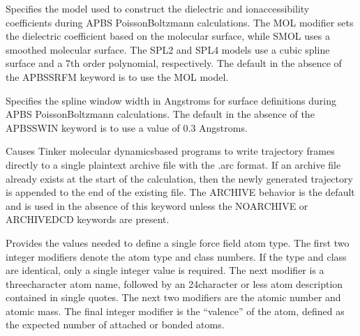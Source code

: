 \documentclass[letterpaper,11pt,english]{sphinxmanual}
\begin{document}
\ignorespaces {}\label{\detokenize{text/keywords:key-apbs-srfm}}\begin{description}
\sphinxAtStartPar
Specifies the model used to construct the dielectric and ion\sphinxhyphen{}accessibility coefficients during APBS Poisson\sphinxhyphen{}Boltzmann calculations. The MOL modifier sets the dielectric coefficient based on the molecular surface, while SMOL uses a smoothed molecular surface. The SPL2 and SPL4 models use a cubic spline surface and a 7th order polynomial, respectively. The default in the absence of the APBS\sphinxhyphen{}SRFM keyword is to use the MOL model.

\end{description}

\ignorespaces {}\label{\detokenize{text/keywords:key-apbs-swin}}\begin{description}
\sphinxAtStartPar
Specifies the spline window width in Angstroms for surface definitions during APBS Poisson\sphinxhyphen{}Boltzmann calculations. The default in the absence of the APBS\sphinxhyphen{}SWIN keyword is to use a value of 0.3 Angstroms.

\end{description}

\ignorespaces {}\label{\detokenize{text/keywords:key-archive}}\begin{description}
\sphinxAtStartPar
Causes Tinker molecular dynamics\sphinxhyphen{}based programs to write trajectory frames directly to a single plain\sphinxhyphen{}text archive file with the .arc format. If an archive file already exists at the start of the calculation, then the newly generated trajectory is appended to the end of the existing file. The ARCHIVE behavior is the default and is used in the absence of this keyword unless the NO\sphinxhyphen{}ARCHIVE or ARCHIVE\sphinxhyphen{}DCD keywords are present.

\end{description}

\ignorespaces {}\label{\detokenize{text/keywords:key-atom}}\begin{description}
\sphinxAtStartPar
Provides the values needed to define a single force field atom type. The first two integer modifiers denote the atom type and class numbers. If the type and class are identical, only a single integer value is required. The next modifier is a three\sphinxhyphen{}character atom name, followed by an 24\sphinxhyphen{}character or less atom description contained in single quotes. The next two modifiers are the atomic number and atomic mass. The final integer modifier is the “valence” of the atom, defined as the expected number of attached or bonded atoms.

\end{description}
\end{document}
